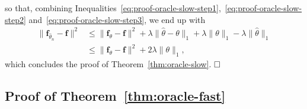 \documentclass[
	fontsize=11pt, %
	twoside=false, %
	numbers=noenddot, %
]{kaobook}
\renewcommand{\bf}{{\boldsymbol f}}
\newcommand{\wh}{\widehat}
\newcommand{\norm}[1]{\| #1 \|}
\begin{document}
so that, combining Inequalities~\eqref{eq:proof-oracle-slow-step1},~\eqref{eq:proof-oracle-slow-step2} and~\eqref{eq:proof-oracle-slow-step3}, we end up with
\begin{align*}
	\norm{\bf_{\wh \theta_n} - \bf}^2 &\leq \norm{\bf_\theta - \bf}^2 
	+ \lambda \norm{\wh \theta - \theta}_1 
	+ \lambda \norm{\theta}_1 
	- \lambda \norm{\wh \theta}_1 \\
	&\leq \norm{\bf_\theta - \bf}^2 + 2 \lambda \norm{\theta}_1,
\end{align*}
which concludes the proof of Theorem~\ref{thm:oracle-slow}. $\hfill \square$


\subsection{Proof of Theorem~\ref{thm:oracle-fast}} %
\label{sub:proof_of_theorem_thm:oracle-fast}
\end{document}
